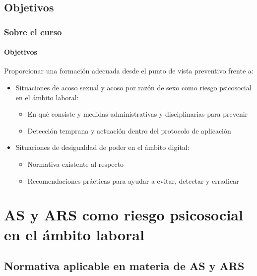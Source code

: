\documentclass{beamer}
\newcommand{\highlight}[1]{{\color{Blue} #1}}
\begin{document}
    \subsection{Objetivos}

    \begin{frame}
		\frametitle{Sobre el curso}
        \framesubtitle{Objetivos}
        Proporcionar una \highlight{formación adecuada} desde el punto de vista preventivo frente a:
        \begin{itemize}
            \item Situaciones de \highlight{acoso sexual y acoso por razón de sexo} como riesgo psicosocial en el ámbito laboral:
            \begin{itemize}
                \item En qué consiste y medidas administrativas y disciplinarias para prevenir
                \item Detección temprana y actuación dentro del protocolo de aplicación
            \end{itemize}
            \item Situaciones de desigualdad de poder en el \highlight{ámbito digital}:
            \begin{itemize}
                \item Normativa existente al respecto
                \item Recomendaciones prácticas para ayudar a evitar, detectar y erradicar
            \end{itemize}
        \end{itemize}
    \end{frame}

    \section{AS y ARS como riesgo psicosocial en el ámbito laboral}

    \subsection{Normativa aplicable en materia de AS y ARS}
\end{document}
